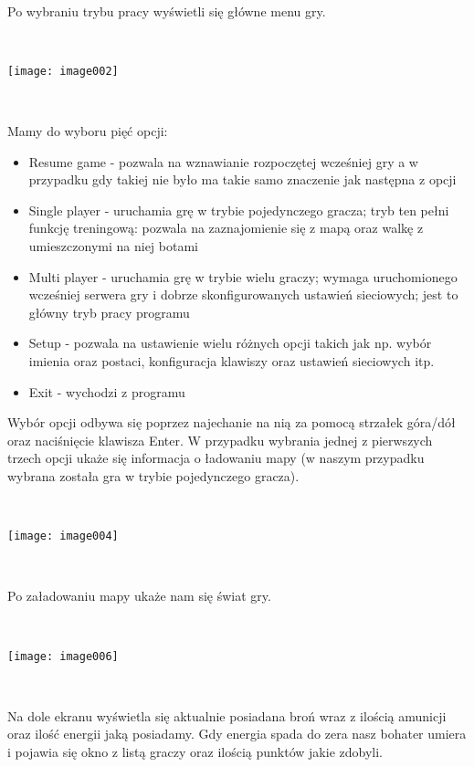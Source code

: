 \documentclass[licencjacka]{pracamgr}
\begin{document}
\ \

Po wybraniu trybu pracy wyświetli się główne menu gry.

\begin{center}
\ \

\texttt{[image: image002]}
\end{center}

\ \

Mamy do wyboru pięć opcji:
\begin{itemize}
    \item Resume game - pozwala na wznawianie rozpoczętej wcześniej gry a w przypadku gdy takiej nie było ma takie samo znaczenie jak następna z opcji
    \item Single player - uruchamia grę w trybie pojedynczego gracza; tryb ten pełni funkcję treningową: pozwala na zaznajomienie się z mapą oraz walkę z umieszczonymi na niej botami
    \item Multi player - uruchamia grę w trybie wielu graczy; wymaga uruchomionego wcześniej serwera gry i dobrze skonfigurowanych ustawień sieciowych; jest to główny tryb pracy programu
    \item Setup - pozwala na ustawienie wielu różnych opcji takich jak np. wybór imienia oraz postaci, konfiguracja klawiszy oraz ustawień sieciowych itp.
    \item Exit - wychodzi z programu
\end{itemize}

Wybór opcji odbywa się poprzez najechanie na nią za pomocą strzałek góra/dół oraz naciśnięcie klawisza Enter. W przypadku wybrania jednej z pierwszych trzech opcji ukaże się informacja o ładowaniu mapy (w naszym przypadku wybrana została gra w trybie pojedynczego gracza).

\begin{center}
\ \

\texttt{[image: image004]}
\end{center}

\ \

Po załadowaniu mapy ukaże nam się świat gry.

\begin{center}
\ \

\texttt{[image: image006]}
\end{center}

\ \

Na dole ekranu wyświetla się aktualnie posiadana broń wraz z ilością amunicji oraz ilość energii jaką posiadamy. Gdy energia spada do zera nasz bohater umiera i pojawia się okno z listą graczy oraz ilością punktów jakie zdobyli.
\end{document}
